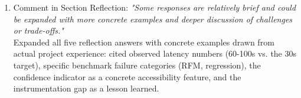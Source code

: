 \begin{enumerate}
\item Comment in Section Reflection: \textit{"Some responses are relatively brief and could be expanded with more concrete examples and deeper discussion of challenges or trade-offs."} \\
Expanded all five reflection answers with concrete examples drawn from actual project experience: cited observed latency numbers (60-100s vs. the 30s target), specific benchmark failure categories (RFM, regression), the confidence indicator as a concrete accessibility feature, and the instrumentation gap as a lesson learned.




  
\end{enumerate}

